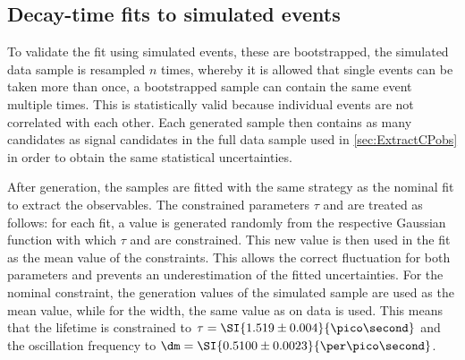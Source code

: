 \subsection{Decay-time fits to simulated events}
\label{sec:valOnSim}

To validate the fit using simulated events, these are bootstrapped, \ie the simulated data sample is resampled $n$ times, whereby it is allowed that single events can be taken more than once, \eg a bootstrapped sample can contain the same event multiple times.
This is statistically valid because individual events are not correlated with each other.
Each generated sample then contains as many candidates as signal candidates in the full \mbox{\BdToDpi} data sample used in \cref{sec:ExtractCPobs} in order to obtain the same statistical uncertainties.

After generation, the samples are fitted with the same strategy as the nominal fit to extract the \CP observables.
The constrained parameters $\tau$ and \dm are treated as follows:
for each fit, a value is generated randomly from the respective Gaussian function with which $\tau$ and \dm are constrained.
This new value is then used in the fit as the mean value of the constraints.
This allows the correct fluctuation for both parameters and prevents an underestimation of the fitted uncertainties.
For the nominal constraint, the generation values of the simulated sample are used as the mean value, while for the width, the same value as on data is used.
This means that the lifetime is constrained to $\tau=\SI{1.519\pm0.004}{\pico\second}$ and the oscillation frequency to $\dm=\SI{0.5100\pm0.0023}{\per\pico\second}$.

